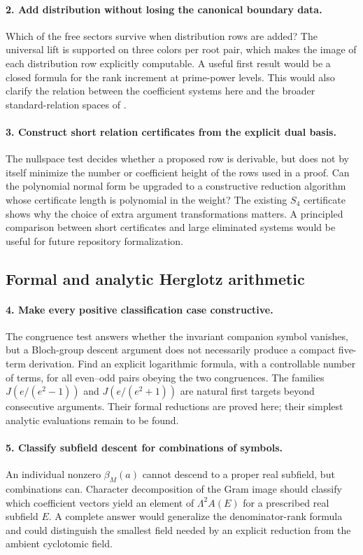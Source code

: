 \documentclass[11pt,a4paper]{article}
\theoremstyle{definition}
\theoremstyle{remark}
\numberwithin{equation}{section}
\begin{document}
\paragraph{2. Add distribution without losing the canonical boundary data.}
Which of the free sectors survive when distribution rows are added?
The universal lift is supported on three colors per root pair, which
makes the image of each distribution row explicitly computable.
A useful first result would be a closed formula for the rank increment
at prime-power levels. This would also clarify the relation between
the coefficient systems here and the broader standard-relation spaces
of \cite{Zhao2010}.

\paragraph{3. Construct short relation certificates from the explicit dual basis.}
The nullspace test decides whether a proposed row is derivable, but
does not by itself minimize the number or coefficient height of the
rows used in a proof. Can the polynomial normal form be upgraded to
a constructive reduction algorithm whose certificate length is
polynomial in the weight? The existing $S_4$ certificate shows why
the choice of extra argument transformations matters. A principled
comparison between short certificates and large eliminated systems
would be useful for future repository formalization.

\subsection{Formal and analytic Herglotz arithmetic}

\paragraph{4. Make every positive classification case constructive.}
The congruence test answers whether the invariant companion symbol
vanishes, but a Bloch-group descent argument does not necessarily
produce a compact five-term derivation. Find an explicit logarithmic
formula, with a controllable number of terms, for all even--odd pairs
obeying the two congruences. The families
$J(e/(e^2-1))$ and $J(e/(e^2+1))$ are natural first targets beyond
consecutive arguments. Their formal reductions are proved here;
their simplest analytic evaluations remain to be found.

\paragraph{5. Classify subfield descent for combinations of symbols.}
An individual nonzero $\beta_M(a)$ cannot descend to a proper real
subfield, but combinations can. Character decomposition of the Gram
image should classify which coefficient vectors yield an element of
$\Lambda^2A(E)$ for a prescribed real subfield $E$. A complete answer
would generalize the denominator-rank formula and could distinguish
the smallest field needed by an explicit reduction from the ambient
cyclotomic field.
\end{document}
